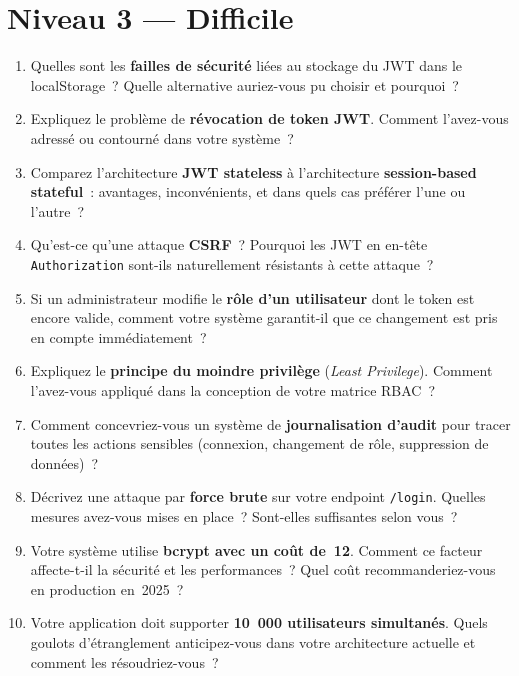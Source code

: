 \documentclass[12pt,a4paper,oneside]{report}
\begin{document}
\section*{\textcolor{HardRed}{Niveau 3 --- Difficile}}

\begin{enumerate}[
  leftmargin=1.5cm,
  label=\textcolor{HardRed}{\textbf{Q\arabic*.}},
  start=21,
  itemsep=10pt
]

\item Quelles sont les \textbf{failles de sécurité} liées au stockage du
      JWT dans le localStorage~? Quelle alternative auriez-vous pu choisir
      et pourquoi~?

\item Expliquez le problème de \textbf{révocation de token JWT}. Comment
      l'avez-vous adressé ou contourné dans votre système~?

\item Comparez l'architecture \textbf{JWT stateless} à l'architecture
      \textbf{session-based stateful}~: avantages, inconvénients, et dans
      quels cas préférer l'une ou l'autre~?

\item Qu'est-ce qu'une attaque \textbf{CSRF}~? Pourquoi les JWT en
      en-tête \texttt{Authorization} sont-ils naturellement résistants à
      cette attaque~?

\item Si un administrateur modifie le \textbf{rôle d'un utilisateur} dont
      le token est encore valide, comment votre système garantit-il que ce
      changement est pris en compte immédiatement~?

\item Expliquez le \textbf{principe du moindre privilège}
      (\textit{Least Privilege}). Comment l'avez-vous appliqué dans la
      conception de votre matrice RBAC~?

\item Comment concevriez-vous un système de \textbf{journalisation
      d'audit} pour tracer toutes les actions sensibles (connexion,
      changement de rôle, suppression de données)~?

\item Décrivez une attaque par \textbf{force brute} sur votre endpoint
      \texttt{/login}. Quelles mesures avez-vous mises en place~? Sont-elles
      suffisantes selon vous~?

\item Votre système utilise \textbf{bcrypt avec un coût de~12}. Comment ce
      facteur affecte-t-il la sécurité et les performances~? Quel coût
      recommanderiez-vous en production en~2025~?

\item Votre application doit supporter \textbf{10~000 utilisateurs
      simultanés}. Quels goulots d'étranglement anticipez-vous dans votre
      architecture actuelle et comment les résoudriez-vous~?

\end{enumerate}
\end{document}
